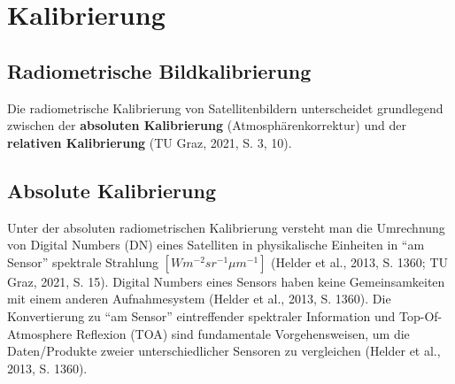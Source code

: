 \documentclass[11pt]{report}
\begin{document}
\section{Kalibrierung}

\subsection{Radiometrische Bildkalibrierung}
Die radiometrische Kalibrierung von Satellitenbildern unterscheidet grundlegend zwischen der \textbf{absoluten Kalibrierung} (Atmosphärenkorrektur) und der \textbf{relativen Kalibrierung} (TU Graz, 2021, S. 3, 10).

\subsection{Absolute Kalibrierung}
Unter der absoluten radiometrischen Kalibrierung versteht man die Umrechnung von Digital Numbers (DN) eines Satelliten in physikalische Einheiten in "`am Sensor"' spektrale Strahlung $\left[Wm^{-2}sr^{-1}\mu m^{-1}\right]$ (Helder et al., 2013, S. 1360; TU Graz, 2021, S. 15). Digital Numbers eines Sensors haben keine Gemeinsamkeiten mit einem anderen Aufnahmesystem (Helder et al., 2013, S. 1360). Die Konvertierung zu "`am Sensor"' eintreffender spektraler Information und Top-Of-Atmosphere Reflexion (TOA) sind fundamentale Vorgehensweisen, um die Daten/Produkte zweier unterschiedlicher Sensoren zu vergleichen (Helder et al., 2013, S. 1360).
\end{document}
